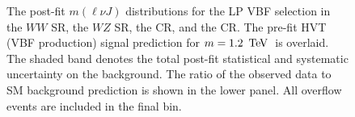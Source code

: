 \begin{figure}[htb]
\caption[Post-fit $m(\ell\nu J)$ distribution for low purity, vector boson fusion selection]{The post-fit $m(\ell\nu J)$ distributions for the LP VBF selection in \protect{} the $WW$ SR, \protect{} the $WZ$ SR, \protect{} the \Wjets CR, and   \protect{} the \ttbar CR.  The pre-fit HVT (VBF production) signal prediction for $m=1.2\,\TeV$\, is overlaid. The shaded band denotes the total post-fit statistical and systematic uncertainty on the background. The ratio of the observed data to SM background prediction is shown in the lower panel. All overflow events are included in the final bin.}
\label{fig:pf_lp_vbf}
\end{figure}

